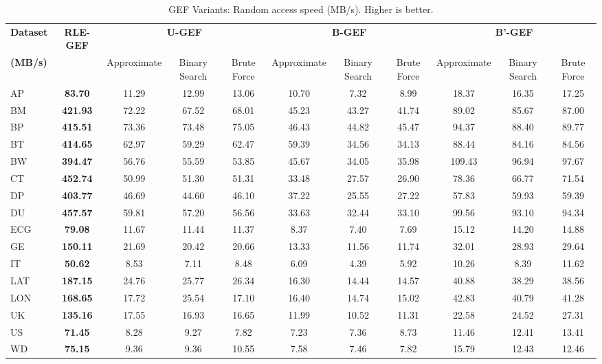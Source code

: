 \begin{table*}[htbp]
\caption{GEF Variants: Random access speed (MB/s). Higher is better.}
\label{tab:gef_access}
\centering
\small
\setlength{\tabcolsep}{4pt} %
\begin{tabular}{lcccccccccc}
\toprule
\textbf{Dataset} & \textbf{RLE-GEF} & \multicolumn{3}{c}{\textbf{U-GEF}} & \multicolumn{3}{c}{\textbf{B-GEF}} & \multicolumn{3}{c}{\textbf{B'-GEF}} \\
\textbf{(MB/s)} &   & Approximate & Binary Search & Brute Force & Approximate & Binary Search & Brute Force & Approximate & Binary Search & Brute Force \\
\cmidrule(lr){3-5} \cmidrule(lr){6-8} \cmidrule(lr){9-11} 
\midrule
AP & \textbf{83.70} & 11.29 & 12.99 & 13.06 & 10.70 & 7.32 & 8.99 & 18.37 & 16.35 & 17.25 \\
BM & \textbf{421.93} & 72.22 & 67.52 & 68.01 & 45.23 & 43.27 & 41.74 & 89.02 & 85.67 & 87.00 \\
BP & \textbf{415.51} & 73.36 & 73.48 & 75.05 & 46.43 & 44.82 & 45.47 & 94.37 & 88.40 & 89.77 \\
BT & \textbf{414.65} & 62.97 & 59.29 & 62.47 & 59.39 & 34.56 & 34.13 & 88.44 & 84.16 & 84.56 \\
BW & \textbf{394.47} & 56.76 & 55.59 & 53.85 & 45.67 & 34.05 & 35.98 & 109.43 & 96.94 & 97.67 \\
CT & \textbf{452.74} & 50.99 & 51.30 & 51.31 & 33.48 & 27.57 & 26.90 & 78.36 & 66.77 & 71.54 \\
DP & \textbf{403.77} & 46.69 & 44.60 & 46.10 & 37.22 & 25.55 & 27.22 & 57.83 & 59.93 & 59.39 \\
DU & \textbf{457.57} & 59.81 & 57.20 & 56.56 & 33.63 & 32.44 & 33.10 & 99.56 & 93.10 & 94.34 \\
ECG & \textbf{79.08} & 11.67 & 11.44 & 11.37 & 8.37 & 7.40 & 7.69 & 15.12 & 14.20 & 14.88 \\
GE & \textbf{150.11} & 21.69 & 20.42 & 20.66 & 13.33 & 11.56 & 11.74 & 32.01 & 28.93 & 29.64 \\
IT & \textbf{50.62} & 8.53 & 7.11 & 8.48 & 6.09 & 4.39 & 5.92 & 10.26 & 8.39 & 11.62 \\
LAT & \textbf{187.15} & 24.76 & 25.77 & 26.34 & 16.30 & 14.44 & 14.57 & 40.88 & 38.29 & 38.56 \\
LON & \textbf{168.65} & 17.72 & 25.54 & 17.10 & 16.40 & 14.74 & 15.02 & 42.83 & 40.79 & 41.28 \\
UK & \textbf{135.16} & 17.55 & 16.93 & 16.65 & 11.99 & 10.52 & 11.31 & 22.58 & 24.52 & 27.31 \\
US & \textbf{71.45} & 8.28 & 9.27 & 7.82 & 7.23 & 7.36 & 8.73 & 11.46 & 12.41 & 13.41 \\
WD & \textbf{75.15} & 9.36 & 9.36 & 10.55 & 7.58 & 7.46 & 7.82 & 15.79 & 12.43 & 12.46 \\
\bottomrule
\end{tabular}
\end{table*}
